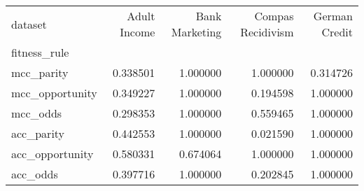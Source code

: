 \begin{tabular}{lrrrr}
\toprule
dataset & Adult Income & Bank Marketing & Compas Recidivism & German Credit \\
fitness_rule &  &  &  &  \\
\midrule
mcc_parity & 0.338501 & 1.000000 & 1.000000 & 0.314726 \\
mcc_opportunity & 0.349227 & 1.000000 & 0.194598 & 1.000000 \\
mcc_odds & 0.298353 & 1.000000 & 0.559465 & 1.000000 \\
acc_parity & 0.442553 & 1.000000 & 0.021590 & 1.000000 \\
acc_opportunity & 0.580331 & 0.674064 & 1.000000 & 1.000000 \\
acc_odds & 0.397716 & 1.000000 & 0.202845 & 1.000000 \\
\bottomrule
\end{tabular}
